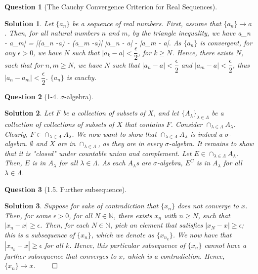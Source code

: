 \documentclass{article} %
\def\eQb#1\eQe{\begin{eqnarray*}#1\end{eqnarray*}}
\theoremstyle{quest}
\newtheorem*{question}{Question}
\newtheorem*{solution}{Solution}
\begin{document}
\bigskip

\begin{question}[The Cauchy Convergence Criterion for Real Sequences]
\end{question}
\begin{solution}
Let $\{ a_n \}$ be a sequence of real numbers. First, assume that $\{ a_n \} \to a$.
Then, for all natural numbers $n$ and $m$, by the triangle inequality, we have
\eQb
|a_n - a_m| = |(a_n -a) - (a_m -a)| \leq |a_n - a| - |a_m - a|.
\eQe
As $\{ a_n \}$ is convergent, for any $\epsilon > 0$, we have $N$ such that
$|a_k - a| < \dfrac{\epsilon}{2}$, for $k \geq N$. Hence, there exists $N$, such that
for $n,m \geq N$, we have $N$ such that $|a_n - a| < \dfrac{\epsilon}{2}$ 
and $|a_m - a| < \dfrac{\epsilon}{2}$, thus $|a_n - a_m| < \dfrac{\epsilon}{2}$. $\{ a_n \}$
is cauchy.
\end{solution}

\pagebreak

\begin{question}[1-4. $\sigma$-algebra]
\end{question}
\begin{solution}
Let $F$ be a collection of subsets of $X$, and let
$\{ A_{\lambda} \}_{\lambda \in \Lambda}$ be 
a collection of collections of subsets of $X$ that contains
$F$. Consider $\cap_{\lambda \in \Lambda} A_{\lambda}$. Clearly, $F \in 
\cap_{\lambda \in \Lambda} A_{\lambda}$. We now want to show that $\cap_{\lambda \in \Lambda}
A_{\lambda}$ is indeed a $\sigma$-algebra. $\emptyset$ and $X$ are in 
$\cap_{\lambda \in \Lambda}$, as they are in every $\sigma$-algebra. It remains to show that
it is "closed" under countable union and complement. Let $E \in \cap_{\lambda \in \Lambda} A_{\lambda}$.
Then, $E$ is in $A_{\lambda}$ for all $\lambda \in \Lambda$. As each $A_{\lambda}$s are $\sigma$-algebra,
$E^{C}$ is in $A_{\lambda}$ for all $\lambda \in \Lambda$.

\end{solution}

\bigskip

\begin{question}[1.5. Further subsequence]
\end{question}
\begin{solution}
Suppose for sake of contradiction that $\{ x_n \}$ does not converge to $x$. Then, for some $\epsilon > 0$,
for all $N \in \mathbb{N}$, there exists $x_n$ with $n \geq N$, such that $|x_n - x| \geq \epsilon$. Then,
for each $N \in \mathbb{N}$, pick an element that satisfies $|x_N - x| \geq \epsilon$; this is a 
subsequence of $\{ x_n \}$, which we denote as $\{ x_{n_k} \}$. We now have that 
$|x_{n_k} - x| \geq \epsilon $ for all $k$. Hence, this particular subsequence of $\{ x_n \}$ cannot
have a further subsequence that converges to $x$, which is a contradiction. Hence, $\{ x_n \} \to x$.
$\qed$
\end{solution}
\end{document}
